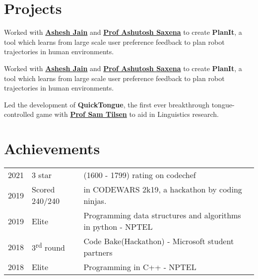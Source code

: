 \documentclass[]{manoj-resume}
\begin{document}
\begin{minipage}[t]{0.66\textwidth}

\section{Projects}
Worked with \textbf{\href{http://www.cs.cornell.edu/~ashesh/}{Ashesh Jain}} and \textbf{\href{http://www.cs.cornell.edu/~asaxena/}{Prof Ashutosh Saxena}} to create \textbf{PlanIt}, a tool which  learns from large scale user preference feedback to plan robot trajectories in human environments.  
\sectionsep

Worked with \textbf{\href{http://www.cs.cornell.edu/~ashesh/}{Ashesh Jain}} and \textbf{\href{http://www.cs.cornell.edu/~asaxena/}{Prof Ashutosh Saxena}} to create \textbf{PlanIt}, a tool which  learns from large scale user preference feedback to plan robot trajectories in human environments.  
\sectionsep

Led the development of \textbf{QuickTongue}, the first ever breakthrough tongue-controlled game with \textbf{\href{http://conf.ling.cornell.edu/~tilsen/}{Prof Sam Tilsen}} to aid in Linguistics research. 
\sectionsep


\section{Achievements} 
\begin{tabular}{rll}

2021 & 3 star  & (1600 - 1799) rating on codechef\\
2019 & Scored 240/240  & in CODEWARS 2k19, a hackathon by coding ninjas.\\
2019 & Elite  & Programming data structures and algorithms in python - NPTEL\\
2018 & 3\textsuperscript{rd} round  & Code Bake(Hackathon) - Microsoft student partners\\
2018 & Elite & Programming in C++ - NPTEL \\

\end{tabular}
\sectionsep

\end{minipage} 
\end{document}
